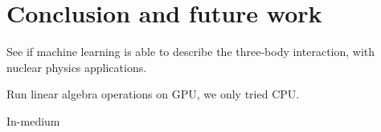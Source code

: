 \chapter{Conclusion and future work} \label{sec:conclusion}
See if machine learning is able to describe the three-body interaction, with nuclear physics applications. 

Run linear algebra operations on GPU, we only tried CPU. 

In-medium